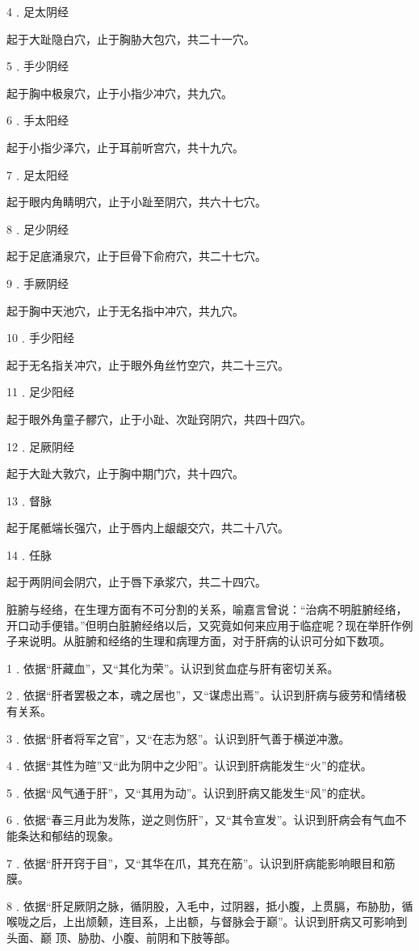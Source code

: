 \documentclass[a4paper,12pt,UTF8,twoside]{ctexbook}
\begin{document}
4﹒足太阴经

起于大趾隐白穴，止于胸胁大包穴，共二十一穴。

5﹒手少阴经

起于胸中极泉穴，止于小指少冲穴，共九穴。

6﹒手太阳经

起于小指少泽穴，止于耳前听宫穴，共十九穴。

7﹒足太阳经

起于眼内角睛明穴，止于小趾至阴穴，共六十七穴。

8﹒足少阴经

起于足底涌泉穴，止于巨骨下俞府穴，共二十七穴。

9﹒手厥阴经

起于胸中天池穴，止于无名指中冲穴，共九穴。

10﹒手少阳经

起于无名指关冲穴，止于眼外角丝竹空穴，共二十三穴。

11﹒足少阳经

起于眼外角童子髎穴，止于小趾、次趾窍阴穴，共四十四穴。

12﹒足厥阴经

起于大趾大敦穴，止于胸中期门穴，共十四穴。

13﹒督脉

起于尾骶端长强穴，止于唇内上龈龈交穴，共二十八穴。

14﹒任脉

起于两阴间会阴穴，止于唇下承浆穴，共二十四穴。

脏腑与经络，在生理方面有不可分割的关系，喻嘉言曾说：“治病不明脏腑经络，开口动手便错。”但明白脏腑经络以后，又究竟如何来应用于临症呢？现在举肝作例子来说明。从脏腑和经络的生理和病理方面，对于肝病的认识可分如下数项。

1﹒依据“肝藏血”，又“其化为荣”。认识到贫血症与肝有密切关系。

2﹒依据“肝者罢极之本，魂之居也”，又“谋虑出焉”。认识到肝病与疲劳和情绪极有关系。

3﹒依据“肝者将军之官”，又“在志为怒”。认识到肝气善于横逆冲激。

4﹒依据“其性为暄”又“此为阴中之少阳”。认识到肝病能发生“火”的症状。

5﹒依据“风气通于肝”，又“其用为动”。认识到肝病又能发生“风”的症状。

6﹒依据“春三月此为发陈，逆之则伤肝”，又“其令宣发”。认识到肝病会有气血不能条达和郁结的现象。

7﹒依据“肝开窍于目”，又“其华在爪，其充在筋”。认识到肝病能影响眼目和筋膜。

8﹒依据“肝足厥阴之脉，循阴股，入毛中，过阴器，抵小腹，上贯膈，布胁肋，循喉咙之后，上出颃颡，连目系，上出额，与督脉会于巅”。认识到肝病又可影响到头面、巅
顶、胁肋、小腹、前阴和下肢等部。
\end{document}
